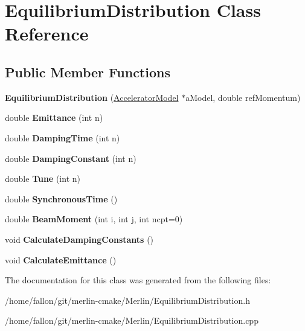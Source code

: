 \hypertarget{classEquilibriumDistribution}{}\section{Equilibrium\+Distribution Class Reference}
\label{classEquilibriumDistribution}
\subsection*{Public Member Functions}
\begin{DoxyCompactItemize}
\item 
\mbox{\label{classEquilibriumDistribution_a9b3e828883b2eeb824fa3789c10aa1f4}} 
{\bfseries Equilibrium\+Distribution} (\hyperlink{classAcceleratorModel}{Accelerator\+Model} $\ast$a\+Model, double ref\+Momentum)
\item 
\mbox{\label{classEquilibriumDistribution_a35f4831dd3a0b3f19cacb28f4b0351c8}} 
double {\bfseries Emittance} (int n)
\item 
\mbox{\label{classEquilibriumDistribution_ae862d379f4dd44fc62bc1ee3caa97b14}} 
double {\bfseries Damping\+Time} (int n)
\item 
\mbox{\label{classEquilibriumDistribution_aee17371cfee938a9ac3317f205256652}} 
double {\bfseries Damping\+Constant} (int n)
\item 
\mbox{\label{classEquilibriumDistribution_a16c2fc4ceae40eaab65e26bb304c8ed3}} 
double {\bfseries Tune} (int n)
\item 
\mbox{\label{classEquilibriumDistribution_ac5db93e0c92bed6dc7d2090a372a1af8}} 
double {\bfseries Synchronous\+Time} ()
\item 
\mbox{\label{classEquilibriumDistribution_a0f2fdfc822b0e82129598facfa289b24}} 
double {\bfseries Beam\+Moment} (int i, int j, int ncpt=0)
\item 
\mbox{\label{classEquilibriumDistribution_a3cde35c512dd20acb7d902baccc4e32f}} 
void {\bfseries Calculate\+Damping\+Constants} ()
\item 
\mbox{\label{classEquilibriumDistribution_acd6501bc6762543a3dd69025fbfa1278}} 
void {\bfseries Calculate\+Emittance} ()
\end{DoxyCompactItemize}


The documentation for this class was generated from the following files\+:\begin{DoxyCompactItemize}
\item 
/home/fallon/git/merlin-\/cmake/\+Merlin/Equilibrium\+Distribution.\+h\item 
/home/fallon/git/merlin-\/cmake/\+Merlin/Equilibrium\+Distribution.\+cpp\end{DoxyCompactItemize}
